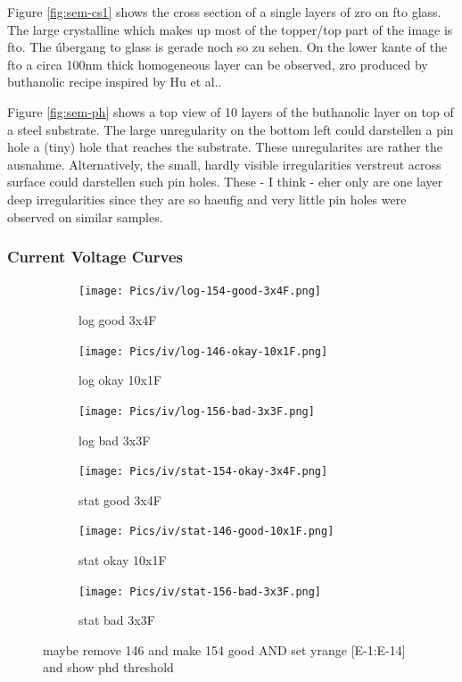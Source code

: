 Figure \ref{fig:sem-cs1} shows the cross section of a single layers of \gls{zro} on \gls{fto} glass. 
The large crystalline  which makes up most of the topper/top part of the image is \gls{fto}. 
The úbergang to glass is gerade noch so zu sehen. 
On the lower kante of the \gls{fto} a circa 100nm thick homogeneous layer can be observed, \gls{zro} produced by buthanolic recipe inspired by Hu et al..

Figure \ref{fig:sem-ph} shows a top view of 10 layers of the buthanolic layer on top of a steel substrate. 
The large unregularity on the bottom left could darstellen a pin hole a (tiny) hole that reaches the substrate. 
These unregularites are rather the ausnahme. 
Alternatively, the small, hardly visible  irregularities verstreut across surface could darstellen such pin holes. 
These - I think - eher only are one layer deep irregularities since they are so haeufig 
and very little pin holes were observed on similar samples. 




\subsubsection{Current Voltage Curves} 
\begin{figure}
    \centering
    \begin{subfigure}{.3\textwidth}
        \texttt{[image: Pics/iv/log-154-good-3x4F.png]}
        \caption{log good 3x4F} \label{fig:iv-log-good}
    \end{subfigure}
    \begin{subfigure}{.3\textwidth}
        \texttt{[image: Pics/iv/log-146-okay-10x1F.png]}
        \caption{log okay 10x1F} \label{fig:iv-log-okay}
    \end{subfigure}
    \begin{subfigure}{.3\textwidth}
        \texttt{[image: Pics/iv/log-156-bad-3x3F.png]}
        \caption{log bad 3x3F} \label{fig:iv-log-bad}
    \end{subfigure}
    \begin{subfigure}{.3\textwidth}
        \texttt{[image: Pics/iv/stat-154-okay-3x4F.png]}
        \caption{stat good 3x4F} \label{fig:iv-stat-good}
    \end{subfigure}
    \begin{subfigure}{.3\textwidth}
        \texttt{[image: Pics/iv/stat-146-good-10x1F.png]}
        \caption{stat okay 10x1F} \label{fig:iv-stat-okay}
    \end{subfigure}
    \begin{subfigure}{.3\textwidth}
        \texttt{[image: Pics/iv/stat-156-bad-3x3F.png]}
        \caption{stat bad 3x3F} \label{fig:iv-stat-bad}
    \end{subfigure}
    \caption{maybe remove 146 and make 154 good AND set yrange [E-1:E-14] and show phd threshold} \label{fig:iv}
\end{figure}

